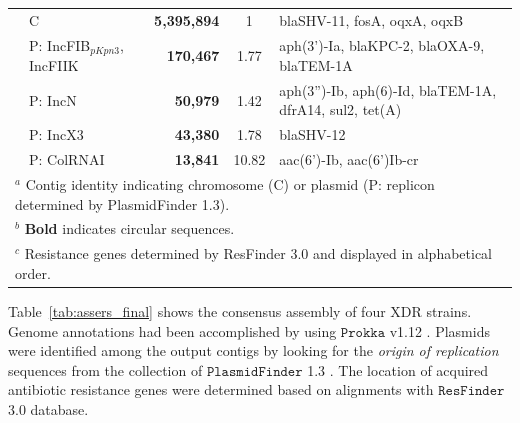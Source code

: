 \begin{landscape}
\begin{table}[!ht]
\begin{tabular}{llrcp{12cm}}
\rowcolor{Gray}
 \cellcolor{white} 			& C                           & \textbf{5,395,894}     & 1        & blaSHV-11, fosA, oqxA, oqxB                                                                                                                \\
                            & P: IncFIB$_{pKpn3}$, IncFIIK     & \textbf{170,467}      & 1.77     & aph(3')-Ia, blaKPC-2, blaOXA-9, blaTEM-1A                                                                                                  \\
\rowcolor{Gray}
 \cellcolor{white}          & P: IncN                     & \textbf{50,979}       & 1.42     & aph(3'')-Ib, aph(6)-Id, blaTEM-1A, dfrA14, sul2, tet(A)                                                                                    \\
                            & P: IncX3                    & \textbf{43,380}       & 1.78     & blaSHV-12                                                                                                                                  \\
\rowcolor{Gray}
 \cellcolor{white} \multirow{-5}{*}{20\_GR\_12} & P: ColRNAI                  & \textbf{13,841}       & 10.82    & aac(6')-Ib, aac(6')Ib-cr                                                                                                                   \\ \hline
\multicolumn{5}{l}{{$^a$ Contig identity indicating chromosome (C) or plasmid (P: replicon determined by PlasmidFinder 1.3).}}\\
\multicolumn{5}{l}{{$^b$ \textbf{Bold} indicates circular sequences.}}\\
\multicolumn{5}{l}{{$^c$ Resistance genes determined by ResFinder 3.0 and displayed in alphabetical order.}}
\end{tabular}
\end{table}
\end{landscape}

Table~\ref{tab:assers_final} shows the consensus assembly of four XDR \kp{} strains. 
Genome annotations had been accomplished by using $\mathtt{Prokka}$ v1.12 \cite{Seemann2014}. 
Plasmids were identified among the output contigs by looking for the \emph{origin of replication} sequences from the collection of $\mathtt{PlasmidFinder}$ 1.3 \cite{Carattoli2014}.
The location of acquired antibiotic resistance genes were determined based on alignments with $\mathtt{ResFinder}$ 3.0 \cite{ZankariHC2012} database. 

